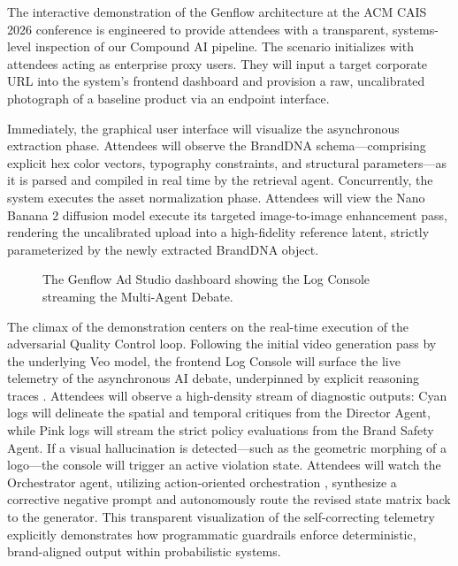 \documentclass[sigconf,authordraft]{acmart}
\begin{document}
The interactive demonstration of the Genflow architecture at the ACM CAIS 2026 conference is engineered to provide attendees with a transparent, systems-level inspection of our Compound AI pipeline. The scenario initializes with attendees acting as enterprise proxy users. They will input a target corporate URL into the system's frontend dashboard and provision a raw, uncalibrated photograph of a baseline product via an endpoint interface.

Immediately, the graphical user interface will visualize the asynchronous extraction phase. Attendees will observe the BrandDNA schema---comprising explicit hex color vectors, typography constraints, and structural parameters---as it is parsed and compiled in real time by the retrieval agent. Concurrently, the system executes the asset normalization phase. Attendees will view the Nano Banana 2 diffusion model execute its targeted image-to-image enhancement pass, rendering the uncalibrated upload into a high-fidelity reference latent, strictly parameterized by the newly extracted BrandDNA object.

\begin{figure}[htbp]
  \centering
  \caption{The Genflow Ad Studio dashboard showing the Log Console streaming the Multi-Agent Debate.}
  \label{fig:dashboard}
\end{figure}

The climax of the demonstration centers on the real-time execution of the adversarial Quality Control loop. Following the initial video generation pass by the underlying Veo model, the frontend Log Console will surface the live telemetry of the asynchronous AI debate, underpinned by explicit reasoning traces \cite{wei2022chain}. Attendees will observe a high-density stream of diagnostic outputs: Cyan logs will delineate the spatial and temporal critiques from the Director Agent, while Pink logs will stream the strict policy evaluations from the Brand Safety Agent. If a visual hallucination is detected---such as the geometric morphing of a logo---the console will trigger an active violation state. Attendees will watch the Orchestrator agent, utilizing action-oriented orchestration \cite{yao2023react}, synthesize a corrective negative prompt and autonomously route the revised state matrix back to the generator. This transparent visualization of the self-correcting telemetry explicitly demonstrates how programmatic guardrails enforce deterministic, brand-aligned output within probabilistic systems.
\end{document}

